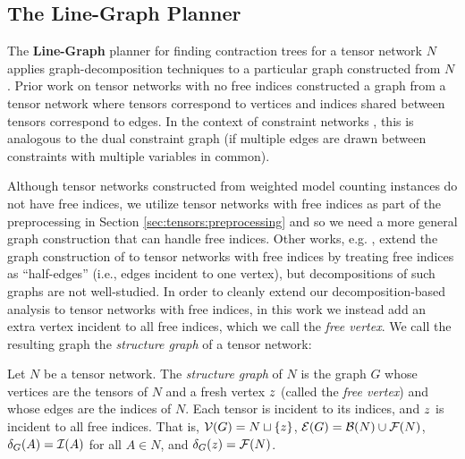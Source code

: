 \subsection{The Line-Graph Planner}
\label{sec:tensors:contraction-theory}
The \textbf{Line-Graph} planner for finding contraction trees for a tensor network $N$ applies graph-decomposition techniques to a particular graph constructed from $N$. Prior work \cite{MS08} on tensor networks with no free indices constructed a graph from a tensor network where tensors correspond to vertices and indices shared between tensors correspond to edges. In the context of constraint networks \cite{dechter03}, this is analogous to the dual constraint graph (if multiple edges are drawn between constraints with multiple variables in common).

Although tensor networks constructed from weighted model counting instances do not have free indices, we utilize tensor networks with free indices as part of the preprocessing in Section \ref{sec:tensors:preprocessing} and so we need a more general graph construction that can handle free indices. Other works, e.g. \cite{Ying17}, extend the graph construction of \cite{MS08} to tensor networks with free indices by treating free indices as ``half-edges'' (i.e., edges incident to one vertex), but decompositions of such graphs are not well-studied. In order to cleanly extend our decomposition-based analysis to tensor networks with free indices, in this work we instead add an extra vertex incident to all free indices, which we call the \emph{free vertex}. We call the resulting graph the \emph{structure graph} of a tensor network:
\begin{definition}\label{def:structure}
	Let $N$ be a tensor network. The \emph{structure graph} of $N$ is the graph $G$ whose 
    vertices are the tensors of $N$ and a fresh vertex $z$ (called the \emph{free vertex}) and whose edges are the indices of $N$. Each tensor is incident to its indices, and $z$ is incident to all free indices.
    That is, $\mathcal{V}(G) = N \sqcup \{ z \}$, $\mathcal{E}(G) = \mathcal{B}(N) \cup \mathcal{F}(N)$, $\delta_{G}(A) = \mathcal{I}(A)$ for all $A \in N$, and $\delta_{G}(z) = \mathcal{F}(N)$.
\end{definition}

